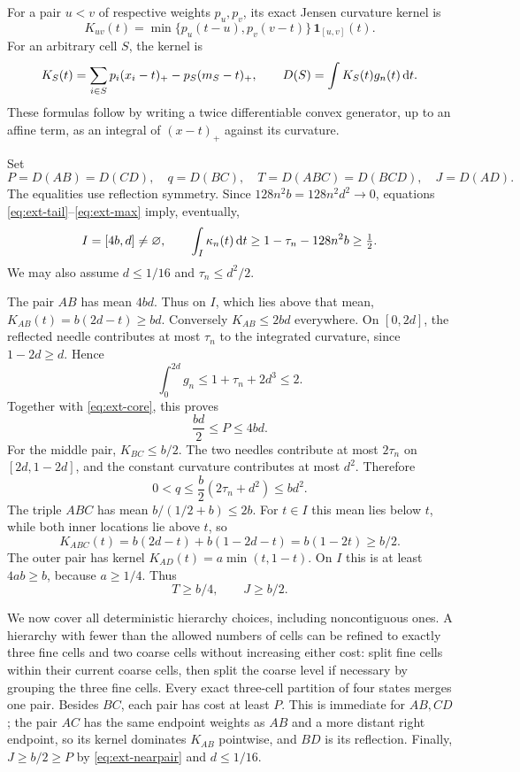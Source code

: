 For a pair $u<v$ of respective weights $p_u,p_v$, its exact Jensen curvature
kernel is
\begin{equation}
 K_{uv}(t)=\min\{p_u(t-u),p_v(v-t)\}\,
           \mathbf1_{[u,v]}(t).
 \label{eq:ext-pairkernel}
\end{equation}
For an arbitrary cell $S$, the kernel is
\[
 K_S(t)=\sum_{i\in S}p_i(x_i-t)_+-p_S(m_S-t)_+,
 \qquad D(S)=\int K_S(t)g_n(t)\,\mathrm d t.
\]
These formulas follow by writing a twice differentiable convex generator,
up to an affine term, as an integral of $(x-t)_+$ against its curvature.

Set
\[
 P=D(AB)=D(CD),\quad q=D(BC),\quad
 T=D(ABC)=D(BCD),\quad J=D(AD).
\]
The equalities use reflection symmetry. Since
$128n^2b=128n^2d^2\to0$, equations
\eqref{eq:ext-tail}--\eqref{eq:ext-max} imply, eventually,
\begin{equation}
 I=[4b,d]\ne\varnothing,\qquad
 \int_I\kappa_n(t)\,\mathrm d t
 \ge1-\tau_n-128n^2b\ge\tfrac12.
 \label{eq:ext-core}
\end{equation}
We may also assume $d\le1/16$ and $\tau_n\le d^2/2$.

The pair $AB$ has mean $4bd$. Thus on $I$, which lies above that mean,
$K_{AB}(t)=b(2d-t)\ge bd$. Conversely $K_{AB}\le2bd$ everywhere.
On $[0,2d]$, the reflected needle contributes at most $\tau_n$ to the
integrated curvature, since $1-2d\ge d$. Hence
\[
 \int_0^{2d}g_n\le1+\tau_n+2d^3\le2.
\]
Together with \eqref{eq:ext-core}, this proves
\begin{equation}
 \frac{bd}{2}\le P\le4bd.
 \label{eq:ext-nearpair}
\end{equation}
For the middle pair, $K_{BC}\le b/2$. The two needles contribute at most
$2\tau_n$ on $[2d,1-2d]$, and the constant curvature contributes at most
$d^2$. Therefore
\begin{equation}
 0<q\le\frac b2(2\tau_n+d^2)\le bd^2.
 \label{eq:ext-middlepair}
\end{equation}
The triple $ABC$ has mean $b/(1/2+b)\le2b$. For $t\in I$ this mean lies
below $t$, while both inner locations lie above $t$, so
\[
 K_{ABC}(t)=b(2d-t)+b(1-2d-t)=b(1-2t)\ge b/2.
\]
The outer pair has kernel $K_{AD}(t)=a\min(t,1-t)$. On $I$ this is at
least $4ab\ge b$, because $a\ge1/4$. Thus
\begin{equation}
 T\ge b/4,\qquad J\ge b/2.
 \label{eq:ext-coarse}
\end{equation}

We now cover all deterministic hierarchy choices, including noncontiguous
ones. A hierarchy with fewer than the allowed numbers of cells can be
refined to exactly three fine cells and two coarse cells without increasing
either cost: split fine cells within their current coarse cells, then split
the coarse level if necessary by grouping the three fine cells. Every exact
three-cell partition of four states merges one pair. Besides $BC$, each
pair has cost at least $P$. This is immediate for $AB,CD$; the pair $AC$
has the same endpoint weights as $AB$ and a more distant right endpoint,
so its kernel dominates $K_{AB}$ pointwise, and $BD$ is its reflection.
Finally, $J\ge b/2\ge P$ by \eqref{eq:ext-nearpair} and $d\le1/16$.

